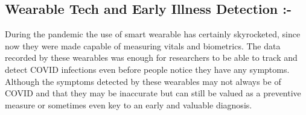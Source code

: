 \documentclass[12pt]{article}
\begin{document}
\begin{Large}
\section{Wearable Tech and Early Illness Detection :- }
During the pandemic the use of smart wearable has certainly skyrocketed, since now they were made capable of measuring vitals and biometrics. The data recorded by these wearables was enough for researchers to be able to track and detect COVID infections even before people notice they have any symptoms. Although the symptoms detected by these wearables may not always be of COVID and that they may be inaccurate but can still be valued as a preventive measure or sometimes even key to an early and valuable diagnosis.

\end{Large}
\end{document}
